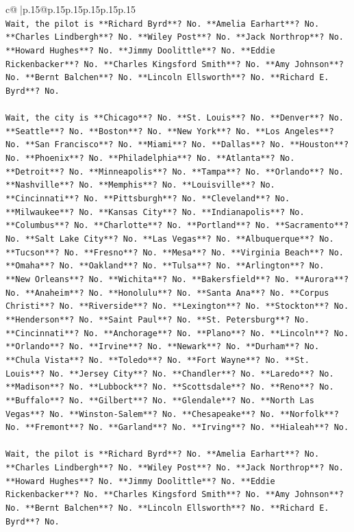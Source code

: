 \documentclass{article}
\begin{document}
{\begin{supertabular}{c@{$\;$}|p{.15\linewidth}@{}p{.15\linewidth}p{.15\linewidth}p{.15\linewidth}p{.15\linewidth}p{.15\linewidth}}
{{{\\ 
\texttt{Wait, the pilot is **Richard Byrd**? No. **Amelia Earhart**? No. **Charles Lindbergh**? No. **Wiley Post**? No. **Jack Northrop**? No. **Howard Hughes**? No. **Jimmy Doolittle**? No. **Eddie Rickenbacker**? No. **Charles Kingsford Smith**? No. **Amy Johnson**? No. **Bernt Balchen**? No. **Lincoln Ellsworth**? No. **Richard E. Byrd**? No.} \\
\\ 
\texttt{Wait, the city is **Chicago**? No. **St. Louis**? No. **Denver**? No. **Seattle**? No. **Boston**? No. **New York**? No. **Los Angeles**? No. **San Francisco**? No. **Miami**? No. **Dallas**? No. **Houston**? No. **Phoenix**? No. **Philadelphia**? No. **Atlanta**? No. **Detroit**? No. **Minneapolis**? No. **Tampa**? No. **Orlando**? No. **Nashville**? No. **Memphis**? No. **Louisville**? No. **Cincinnati**? No. **Pittsburgh**? No. **Cleveland**? No. **Milwaukee**? No. **Kansas City**? No. **Indianapolis**? No. **Columbus**? No. **Charlotte**? No. **Portland**? No. **Sacramento**? No. **Salt Lake City**? No. **Las Vegas**? No. **Albuquerque**? No. **Tucson**? No. **Fresno**? No. **Mesa**? No. **Virginia Beach**? No. **Omaha**? No. **Oakland**? No. **Tulsa**? No. **Arlington**? No. **New Orleans**? No. **Wichita**? No. **Bakersfield**? No. **Aurora**? No. **Anaheim**? No. **Honolulu**? No. **Santa Ana**? No. **Corpus Christi**? No. **Riverside**? No. **Lexington**? No. **Stockton**? No. **Henderson**? No. **Saint Paul**? No. **St. Petersburg**? No. **Cincinnati**? No. **Anchorage**? No. **Plano**? No. **Lincoln**? No. **Orlando**? No. **Irvine**? No. **Newark**? No. **Durham**? No. **Chula Vista**? No. **Toledo**? No. **Fort Wayne**? No. **St. Louis**? No. **Jersey City**? No. **Chandler**? No. **Laredo**? No. **Madison**? No. **Lubbock**? No. **Scottsdale**? No. **Reno**? No. **Buffalo**? No. **Gilbert**? No. **Glendale**? No. **North Las Vegas**? No. **Winston{-}Salem**? No. **Chesapeake**? No. **Norfolk**? No. **Fremont**? No. **Garland**? No. **Irving**? No. **Hialeah**? No.} \\
\\ 
\texttt{Wait, the pilot is **Richard Byrd**? No. **Amelia Earhart**? No. **Charles Lindbergh**? No. **Wiley Post**? No. **Jack Northrop**? No. **Howard Hughes**? No. **Jimmy Doolittle**? No. **Eddie Rickenbacker**? No. **Charles Kingsford Smith**? No. **Amy Johnson**? No. **Bernt Balchen**? No. **Lincoln Ellsworth**? No. **Richard E. Byrd**? No.} \\
\\ 
}}}
\end{supertabular}}
\end{document}
